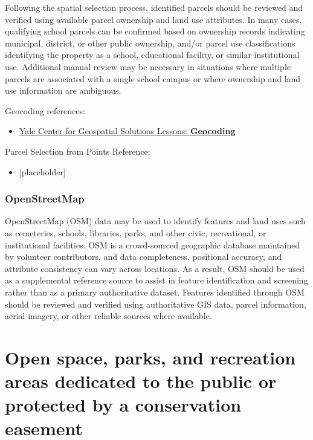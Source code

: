 \documentclass[
  letterpaper,
  DIV=11,
  numbers=noendperiod]{scrreprt}
\providecommand{\tightlist}{%
  \setlength{\itemsep}{0pt}\setlength{\parskip}{0pt}}
\begin{document}
Following the spatial selection process, identified parcels should be
reviewed and verified using available parcel ownership and land use
attributes. In many cases, qualifying school parcels can be confirmed
based on ownership records indicating municipal, district, or other
public ownership, and/or parcel use classifications identifying the
property as a school, educational facility, or similar institutional
use. Additional manual review may be necessary in situations where
multiple parcels are associated with a single school campus or where
ownership and land use information are ambiguous.

Geocoding references:

\begin{itemize}
\tightlist
\item
  \href{https://geospatial.yale.edu/tutorials-geocoding}{Yale Center for
  Geospatial Solutions Lessons: \textbf{Geocoding}}
\end{itemize}

Parcel Selection from Points Reference:

\begin{itemize}
\tightlist
\item
  {[}placeholder{]}
\end{itemize}

\subsubsection{OpenStreetMap}\label{sec-openstreetmap}

OpenStreetMap (OSM) data may be used to identify features and land uses
such as cemeteries, schools, libraries, parks, and other civic,
recreational, or institutional facilities. OSM is a crowd-sourced
geographic database maintained by volunteer contributors, and data
completeness, positional accuracy, and attribute consistency can vary
across locations. As a result, OSM should be used as a supplemental
reference source to assist in feature identification and screening
rather than as a primary authoritative dataset. Features identified
through OSM should be reviewed and verified using authoritative GIS
data, parcel information, aerial imagery, or other reliable sources
where available.

\section{Open space, parks, and recreation areas dedicated to the public
or protected by a conservation
easement}\label{open-space-parks-and-recreation-areas-dedicated-to-the-public-or-protected-by-a-conservation-easement}
\end{document}
